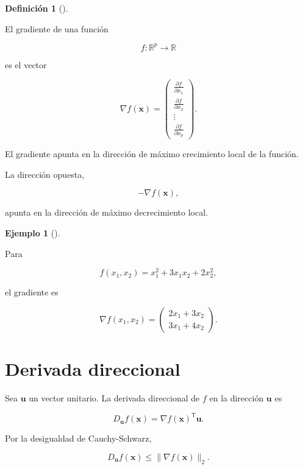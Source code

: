 \documentclass[
  spanish,
  11pt,
  letterpaper,
  DIV=11,
  numbers=noendperiod]{scrreprt}
\theoremstyle{definition}
\newtheorem{definition}{Definición}[chapter]
\theoremstyle{plain}
\theoremstyle{definition}
\newtheorem{example}{Ejemplo}[chapter]
\theoremstyle{remark}
\begin{document}
\begin{definition}[]\protect\hypertarget{def-gradiente}{}\label{def-gradiente}

El gradiente de una función

\[
f:\mathbb{R}^{p}\to\mathbb{R}
\]

es el vector

\[
\nabla f(\mathbf{x})
=
\begin{pmatrix}
\frac{\partial f}{\partial x_1}\\
\frac{\partial f}{\partial x_2}\\
\vdots\\
\frac{\partial f}{\partial x_p}
\end{pmatrix}.
\]

\end{definition}

El gradiente apunta en la dirección de máximo crecimiento local de la
función.

La dirección opuesta,

\[
-\nabla f(\mathbf{x}),
\]

apunta en la dirección de máximo decrecimiento local.

\begin{example}[]\protect\hypertarget{exm-gradiente}{}\label{exm-gradiente}

Para

\[
f(x_1,x_2)
=
x_1^2+3x_1x_2+2x_2^2,
\]

el gradiente es

\[
\nabla f(x_1,x_2)
=
\begin{pmatrix}
2x_1+3x_2\\
3x_1+4x_2
\end{pmatrix}.
\]

\end{example}

\section{Derivada direccional}\label{derivada-direccional}

Sea \(\mathbf{u}\) un vector unitario. La derivada direccional de \(f\)
en la dirección \(\mathbf{u}\) es

\[
D_{\mathbf{u}}f(\mathbf{x})
=
\nabla f(\mathbf{x})^{\mathsf T}\mathbf{u}.
\]

Por la desigualdad de Cauchy-Schwarz,

\[
D_{\mathbf{u}}f(\mathbf{x})
\leq
\|\nabla f(\mathbf{x})\|_2.
\]
\end{document}
